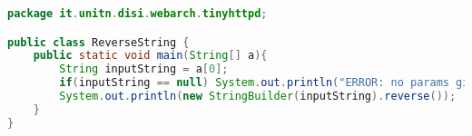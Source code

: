 \begin{lstlisting}[language=java, caption={Class that reverses a string}]
package it.unitn.disi.webarch.tinyhttpd;

public class ReverseString {
    public static void main(String[] a){
        String inputString = a[0];
        if(inputString == null) System.out.println("ERROR: no params given");
        System.out.println(new StringBuilder(inputString).reverse());
    }
}
\end{lstlisting}